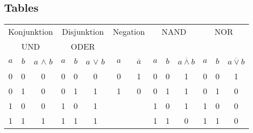 \begin{appendices}
\subsection{Tables}
\begin{center}
	\begin{tabular}[c]{c | c | c || c| c | c || c | c || c | c | c || c| c| c}
		\multicolumn{3}{c||}{Konjunktion}	&	\multicolumn{3}{c||}{Disjunktion} & \multicolumn{2}{c||}{Negation} & \multicolumn{3}{c||}{NAND} & \multicolumn{3}{c}{NOR}\\
		\multicolumn{3}{c||}{UND}	&	\multicolumn{3}{c||}{ODER} & \multicolumn{2}{c||}{} & \multicolumn{3}{c||}{} & \multicolumn{3}{c}{}\\
		\hline
		$a$ & $b$ & $a$ $\wedge$ $b$ & $a$ & $b$ & $a$ $\vee$ $b$ & $a$ & $\bar{a}$ & $a$ & $b$ & $\overline{a \wedge b}$ & $a$ & $b$ & $\overline{a \vee b}$\\
		\hline
		0 & 0 & 0 & 0 & 0 & 0 & 0 & 1 & 0 & 0 & 1 & 0 & 0 & 1\\
		0 & 1 & 0 & 0 & 1 & 1 & 1 & 0 & 0 & 1 & 1 & 0 & 1 & 0\\
		1 & 0 & 0 & 1 & 0 & 1 & & & 1 & 0 & 1 & 1 & 0 & 0\\
		1 & 1 & 1 & 1 & 1 & 1 & & & 1 & 1 & 0 & 1 & 1 & 0\\
		\hline
	\end{tabular}
\end{center}

\end{appendices}